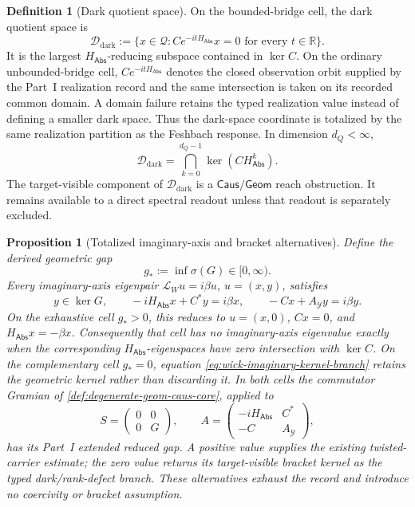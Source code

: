 \documentclass[11pt]{article}
\numberwithin{section}{part}
\theoremstyle{plain}
\newtheorem{proposition}[proposition]{Proposition}
\theoremstyle{definition}
\newtheorem{definition}[definition]{Definition}
\theoremstyle{remark}
\newcommand{\Geom}{\mathsf{Geom}}
\newcommand{\Caus}{\mathsf{Caus}}
\newcommand{\Abs}{\mathsf{Abs}}
\begin{document}
\begin{definition}[Dark quotient space]
\label{def:wick-dark-space}
On the bounded-bridge cell, the dark quotient space is
\begin{equation}
 \label{eq:wick-dark-space}
 \mathcal D_{\mathrm{dark}}
 :=\{x\in\mathcal Q:
       Ce^{-itH_{\Abs}}x=0\text{ for every }t\in\mathbb R\}.
\end{equation}
It is the largest \(H_{\Abs}\)-reducing subspace contained in \(\ker C\).
On the ordinary unbounded-bridge cell, \(Ce^{-itH_{\Abs}}\) denotes the
closed observation orbit supplied by the Part~I realization record and the
same intersection is taken on its recorded common domain.  A domain failure
retains the typed realization value instead of defining a smaller dark
space.  Thus the dark-space coordinate is totalized by the same realization
partition as the Feshbach response.
In dimension \(d_Q<\infty\),
\begin{equation}
 \label{eq:wick-finite-dark-space}
 \mathcal D_{\mathrm{dark}}
 =\bigcap_{k=0}^{d_Q-1}\ker(CH_{\Abs}^k).
\end{equation}
The target-visible component of \(\mathcal D_{\mathrm{dark}}\) is a
\(\Caus/\Geom\) reach obstruction.  It remains available to a direct
spectral readout unless that readout is separately excluded.
\end{definition}

\begin{proposition}[Totalized imaginary-axis and bracket alternatives]
\label{prop:wick-dark-bracket-alternatives}
Define the derived geometric gap
\[
 g_*:=\inf\sigma(G)\in[0,\infty).
\]
Every imaginary-axis eigenpair \(\mathcal L_Wu=i\beta u\),
\(u=(x,y)\), satisfies
\begin{equation}
 \label{eq:wick-imaginary-kernel-branch}
 y\in\ker G,
 \qquad
 -iH_{\Abs}x+C^*y=i\beta x,
 \qquad
 -Cx+A_{\mathcal Y}y=i\beta y.
\end{equation}
On the exhaustive cell \(g_*>0\), this reduces to
\(u=(x,0)\), \(Cx=0\), and \(H_{\Abs}x=-\beta x\).  Consequently that
cell has no imaginary-axis eigenvalue exactly when the corresponding
\(H_{\Abs}\)-eigenspaces have zero intersection with \(\ker C\).  On the
complementary cell \(g_*=0\), equation
\eqref{eq:wick-imaginary-kernel-branch} retains the geometric kernel rather
than discarding it.  In both cells the commutator Gramian of
\cref{def:degenerate-geom-caus-core}, applied to
\[
 S=\begin{pmatrix}0&0\\0&G\end{pmatrix},
 \qquad
 A=\begin{pmatrix}-iH_{\Abs}&C^*\\-C&A_{\mathcal Y}\end{pmatrix},
\]
has its Part~I extended reduced gap.  A positive value supplies the existing
twisted-carrier estimate; the zero value returns its target-visible bracket
kernel as the typed dark/rank-defect branch.  These alternatives exhaust the
record and introduce no coercivity or bracket assumption.
\end{proposition}
\end{document}
